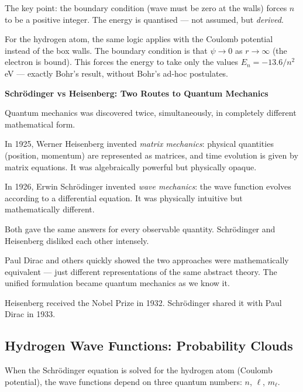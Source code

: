\documentclass[12pt, a4paper]{book}
\begin{document}
\vspace{0.5em}

The key point: the boundary condition (wave must be zero
at the walls) forces $n$ to be a positive integer.
The energy is quantised --- not assumed, but \emph{derived}.

For the hydrogen atom, the same logic applies with the
Coulomb potential instead of the box walls.
The boundary condition is that $\psi \to 0$ as $r \to \infty$
(the electron is bound).
This forces the energy to take only the values
$E_n = -13.6/n^2$ eV --- exactly Bohr's result,
without Bohr's ad-hoc postulates.

\begin{historybox}
\textbf{Schr\"{o}dinger vs Heisenberg: Two Routes to Quantum Mechanics}

Quantum mechanics was discovered twice, simultaneously,
in completely different mathematical form.

In 1925, Werner Heisenberg invented \emph{matrix mechanics}:
physical quantities (position, momentum) are represented
as matrices, and time evolution is given by matrix equations.
It was algebraically powerful but physically opaque.

In 1926, Erwin Schr\"{o}dinger invented \emph{wave mechanics}:
the wave function evolves according to a differential equation.
It was physically intuitive but mathematically different.

Both gave the same answers for every observable quantity.
Schr\"{o}dinger and Heisenberg disliked each other intensely.

Paul Dirac and others quickly showed the two approaches were
mathematically equivalent --- just different representations
of the same abstract theory.
The unified formulation became quantum mechanics as we know it.

Heisenberg received the Nobel Prize in 1932.
Schr\"{o}dinger shared it with Paul Dirac in 1933.
\end{historybox}

\subsection{Hydrogen Wave Functions: Probability Clouds}

When the Schr\"{o}dinger equation is solved for the
hydrogen atom (Coulomb potential), the wave functions
depend on three quantum numbers: $n$, $\ell$, $m_\ell$.
\end{document}

